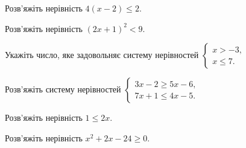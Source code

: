 \documentclass[12pt]{article}
\begin{document}
\begin{samepage}
\noindent\zadnum Розв'яжіть нерівність $4(x - 2) \leqslant 2$. 
\answerTable{$(-\infty; 1]$}{$[1; +\infty)$}{$(-\infty; 2{,}5]$}{$(-\infty; 1{,}5]$}{$[2{,}5; +\infty)$}
\par{}
\end{samepage}

\begin{samepage}
\noindent\zadnum Розв'яжіть нерівність $(2x + 1)^2 < 9$. 
\par{}\vspace{0.25cm}
\end{samepage}

\begin{samepage}
\noindent\zadnum Укажіть число, яке задовольняє систему нерівностей $\begin{cases} x > -3, \\ x \leqslant 7. \end{cases}$ 
\par{}
\end{samepage}

\begin{samepage}
\noindent\zadnum Розв'яжіть систему нерівностей $\begin{cases} 3x - 2 \geqslant 5x - 6, \\ 7x + 1 \leqslant 4x - 5. \end{cases}$ 
\par{}
\end{samepage}

\begin{samepage}
\noindent\zadnum Розв'яжіть нерівність $1 \leqslant 2x$. 
\answerTable{$[0{,}5; +\infty)$}{$[2; +\infty)$}{$(-\infty; -1]$}{$(-\infty; 0{,}5]$}{$(-\infty; 2]$}
\par{}
\end{samepage}

\begin{samepage}
\noindent\zadnum Розв'яжіть нерівність $x^2 + 2x - 24 \geqslant 0$. 
\nmtOptions{$(-\infty; -6] \cup [4; +\infty)$}{$(-\infty; -6]$}{$[-4; 6]$}{$(-\infty; -4] \cup [6; +\infty)$}{$[-6; 4]$}
\par{}\vspace{0.25cm}
\end{samepage}
\end{document}
